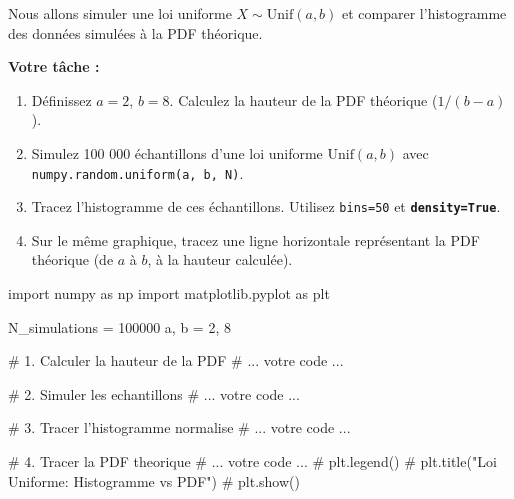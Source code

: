 \begin{exercicebox}
Nous allons simuler une loi uniforme $X \sim \text{Unif}(a, b)$ et comparer l'histogramme des données simulées à la PDF théorique.

\textbf{Votre tâche :}
\begin{enumerate}
    \item Définissez $a=2$, $b=8$. Calculez la hauteur de la PDF théorique ($1 / (b-a)$).
    \item Simulez 100 000 échantillons d'une loi uniforme $\text{Unif}(a, b)$ avec \texttt{numpy.random.uniform(a, b, N)}.
    \item Tracez l'histogramme de ces échantillons. Utilisez \texttt{bins=50} et \textbf{\texttt{density=True}}.
    \item Sur le même graphique, tracez une ligne horizontale représentant la PDF théorique (de $a$ à $b$, à la hauteur calculée).
\end{enumerate}

\begin{codecell}
import numpy as np
import matplotlib.pyplot as plt

N_simulations = 100000
a, b = 2, 8

# 1. Calculer la hauteur de la PDF
# ... votre code ...

# 2. Simuler les echantillons
# ... votre code ...

# 3. Tracer l'histogramme normalise
# ... votre code ...

# 4. Tracer la PDF theorique
# ... votre code ...
# plt.legend()
# plt.title("Loi Uniforme: Histogramme vs PDF")
# plt.show()
\end{codecell}
\end{exercicebox}


